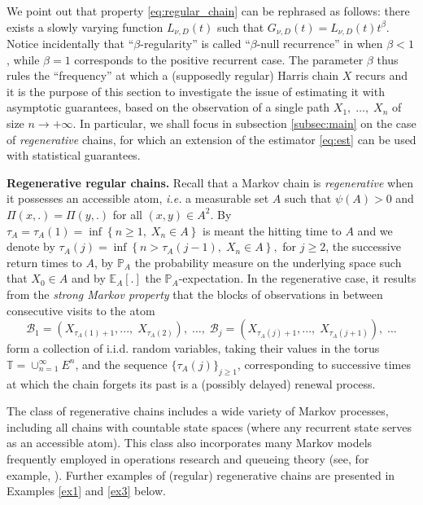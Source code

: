 \documentclass[sn-mathphys-ay]{sn-jnl}%
\begin{document}
We point out that property \eqref{eq:regular_chain} can be rephrased as follows: there
exists a slowly varying function $L_{\nu, D}(t)$ such that $G_{\nu, D}(t)=L_{\nu,
    D}(t)t^{\beta}$. Notice incidentally that ``$\beta$-regularity'' is called ``$\beta$-null
recurrence'' in \cite{Tjostheim-2001} when $\beta<1$, while $\beta=1$ corresponds to the
positive recurrent case. The parameter $\beta$ thus rules the ``frequency'' at which a
(supposedly regular) Harris chain $X$ recurs \citep{Chen1999} and it is the purpose of
this section to investigate the issue of estimating it with asymptotic guarantees, based
on the observation of a single path $X_1,\; \ldots,\; X_n$ of size $n\to+\infty$. In
particular, we shall focus in subsection \ref{subsec:main} on the case of
\textit{regenerative} chains, for which an extension of the estimator \eqref{eq:est} can
be used with statistical guarantees. \medskip

\noindent \textbf{Regenerative regular chains.} Recall that a Markov chain is
\textit{regenerative} when it possesses an accessible atom, \textit{i.e.} a measurable
set $A$ such that $\psi(A)>0$ and $\Pi(x,.)=\Pi(y,.)$ for all $(x,y)\in A^{2}$. By
$\tau_{A}=\tau_{A}(1)=\inf\left\{ n\geq1,\;X_{n}\in A\right\}$ is meant the hitting time
to $A$ and we denote by $\tau_{A} (j)=\inf\left\{ n>\tau_{A}(j-1),\;X_{n}\in A\right\} ,
$ for $j\geq2$, the successive return times to $A$, by $\mathbb{P}_{A}$ the probability
measure on the underlying space such that $X_{0}\in A$ and by $\mathbb{E}_{A}[.]$ the
$\mathbb{P}_{A}$-expectation. In the regenerative case, it results from the
\textit{strong Markov property} that the blocks of observations in between consecutive
visits to the atom
\begin{equation}\label{eq:traj}
    \mathcal{B}_{1}=(X_{\tau_{A}(1)+1},...,\;X_{\tau_{A}(2)}),\; \ldots,\;
    \mathcal{B}_{j}=(X_{\tau_{A}(j)+1},...,\;X_{\tau_{A}(j+1)}),\;\ldots
\end{equation}
form a collection of i.i.d. random variables, taking their values in the torus
$\mathbb{T}=\cup_{n=1}^{\infty}E^{n}$, and the sequence $\{\tau_{A}%
    (j)\}_{j\geq1}$, corresponding to successive times at which the chain forgets
its past is a (possibly delayed) renewal process.

The class of regenerative chains includes a wide variety of Markov processes, including
all chains with countable state spaces (where any recurrent state serves as an accessible
atom). This class also incorporates many Markov models frequently employed in operations
research and queueing theory (see, for example, \cite{Asmussen2010}). Further examples of
(regular) regenerative chains are presented in Examples \ref{ex1} and \ref{ex3} below.
\end{document}
